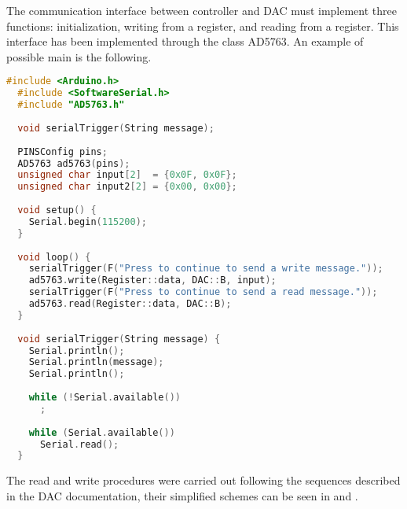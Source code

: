 
The communication interface between controller and DAC must implement three functions: initialization, writing from a register, and reading from a register. This interface has been implemented through the class AD5763. An example of possible main is the following.

\begin{lstlisting}[language=c++, gobble=2]
  #include <Arduino.h>
  #include <SoftwareSerial.h>
  #include "AD5763.h"
  
  void serialTrigger(String message);
  
  PINSConfig pins;
  AD5763 ad5763(pins);
  unsigned char input[2]  = {0x0F, 0x0F};
  unsigned char input2[2] = {0x00, 0x00};
  
  void setup() {
    Serial.begin(115200);
  }
  
  void loop() {
    serialTrigger(F("Press to continue to send a write message."));
    ad5763.write(Register::data, DAC::B, input);
    serialTrigger(F("Press to continue to send a read message."));
    ad5763.read(Register::data, DAC::B);
  }
  
  void serialTrigger(String message) {
    Serial.println();
    Serial.println(message);
    Serial.println();
  
    while (!Serial.available())
      ;
  
    while (Serial.available())
      Serial.read();
  }
\end{lstlisting}

The read and write procedures were carried out following the sequences described in the DAC documentation, their simplified schemes can be seen in  and .